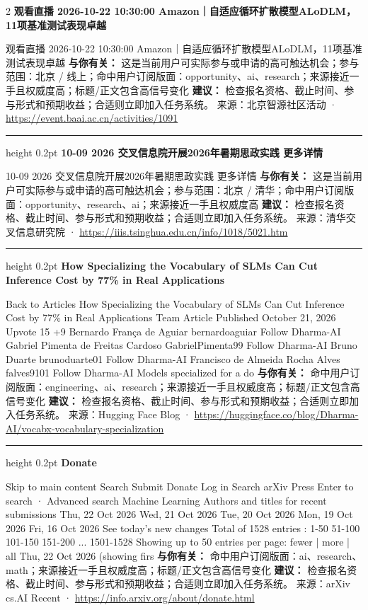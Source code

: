 \documentclass[10.5pt]{ctexart}
\begin{document}
\begin{multicols}{2}
{\large\bfseries 观看直播 2026-10-22 10:30:00 Amazon｜自适应循环扩散模型ALoDLM，11项基准测试表现卓越}\par
观看直播 2026-10-22 10:30:00 Amazon｜自适应循环扩散模型ALoDLM，11项基准测试表现卓越
\textbf{与你有关：} 这是当前用户可实际参与或申请的高可触达机会；参与范围：北京 / 线上；命中用户订阅版面：opportunity、ai、research；来源接近一手且权威度高；标题/正文包含高信号变化
\textbf{建议：} 检查报名资格、截止时间、参与形式和预期收益；合适则立即加入任务系统。
{\footnotesize\color{ormuted} 来源：北京智源社区活动 · \url{https://event.baai.ac.cn/activities/1091}}
\vspace{2mm}
\hrule height 0.2pt
\vspace{2mm}
{\large\bfseries 10-09 2026 交叉信息院开展2026年暑期思政实践 更多详情}\par
10-09 2026 交叉信息院开展2026年暑期思政实践 更多详情
\textbf{与你有关：} 这是当前用户可实际参与或申请的高可触达机会；参与范围：北京 / 清华；命中用户订阅版面：opportunity、research、ai；来源接近一手且权威度高
\textbf{建议：} 检查报名资格、截止时间、参与形式和预期收益；合适则立即加入任务系统。
{\footnotesize\color{ormuted} 来源：清华交叉信息研究院 · \url{https://iiis.tsinghua.edu.cn/info/1018/5021.htm}}
\vspace{2mm}
\hrule height 0.2pt
\vspace{2mm}
{\large\bfseries How Specializing the Vocabulary of SLMs Can Cut Inference Cost by 77\% in Real Applications}\par
Back to Articles How Specializing the Vocabulary of SLMs Can Cut Inference Cost by 77\% in Real Applications Team Article Published October 21, 2026 Upvote 15 +9 Bernardo França de Aguiar bernardoaguiar Follow Dharma-AI Gabriel Pimenta de Freitas Cardoso GabrielPimenta99 Follow Dharma-AI Bruno Duarte brunoduarte01 Follow Dharma-AI Francisco de Almeida Rocha Alves falves9101 Follow Dharma-AI Models specialized for a do
\textbf{与你有关：} 命中用户订阅版面：engineering、ai、research；来源接近一手且权威度高；标题/正文包含高信号变化
\textbf{建议：} 检查报名资格、截止时间、参与形式和预期收益；合适则立即加入任务系统。
{\footnotesize\color{ormuted} 来源：Hugging Face Blog · \url{https://huggingface.co/blog/Dharma-AI/vocabx-vocabulary-specialization}}
\vspace{2mm}
\hrule height 0.2pt
\vspace{2mm}
{\large\bfseries Donate}\par
Skip to main content Search Submit Donate Log in Search arXiv Press Enter to search · Advanced search Machine Learning Authors and titles for recent submissions Thu, 22 Oct 2026 Wed, 21 Oct 2026 Tue, 20 Oct 2026 Mon, 19 Oct 2026 Fri, 16 Oct 2026 See today's new changes Total of 1528 entries : 1-50 51-100 101-150 151-200 ... 1501-1528 Showing up to 50 entries per page: fewer | more | all Thu, 22 Oct 2026 (showing firs
\textbf{与你有关：} 命中用户订阅版面：ai、research、math；来源接近一手且权威度高；标题/正文包含高信号变化
\textbf{建议：} 检查报名资格、截止时间、参与形式和预期收益；合适则立即加入任务系统。
{\footnotesize\color{ormuted} 来源：arXiv cs.AI Recent · \url{https://info.arxiv.org/about/donate.html}}
\end{multicols}
\end{document}
